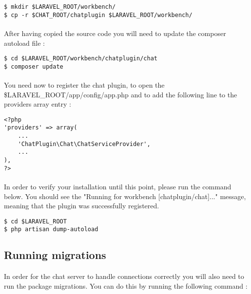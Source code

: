 \begin{verbatim}
$ mkdir $LARAVEL_ROOT/workbench/
$ cp -r $CHAT_ROOT/chatplugin $LARAVEL_ROOT/workbench/
\end{verbatim}

\paragraph{} After having copied the source code you will need to update the 
composer autoload file :

\begin{verbatim}
$ cd $LARAVEL_ROOT/workbench/chatplugin/chat
$ composer update
\end{verbatim}

\paragraph{} You need now to register the chat plugin, to open the \\
\$LARAVEL\_ROOT/app/config/app.php and to add the following line to the 
providers 
array entry :

\begin{verbatim}
<?php
'providers' => array(
    ...
    'ChatPlugin\Chat\ChatServiceProvider',
    ...
),
?>
\end{verbatim}

\paragraph{} In order to verify your installation until this point, please run 
the command below. You should see the "Running for workbench 
[chatplugin/chat]..." message, meaning that the plugin was successfully 
registered.

\begin{verbatim}
$ cd $LARAVEL_ROOT
$ php artisan dump-autoload
\end{verbatim}

\subsection{Running migrations}

\paragraph{} In order for the chat server to handle connections correctly you 
will also need to run the package migrations. You can do this by running the 
following command :

